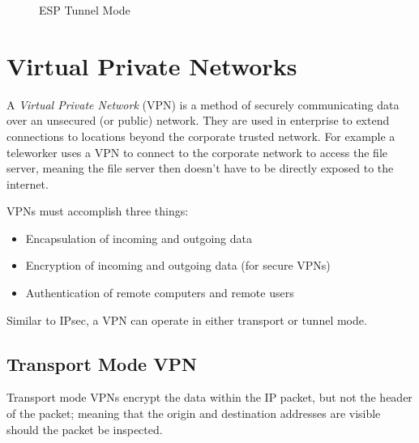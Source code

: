 \begin{figure}[H]
    \centering
    \caption{ESP Tunnel Mode}
\end{figure}

\section{Virtual Private Networks}
A \textit{Virtual Private Network} (VPN) is a method of securely communicating data over an unsecured (or public) network. They are used in enterprise to extend connections to locations beyond the corporate trusted network. For example a teleworker uses a VPN to connect to the corporate network to access the file server, meaning the file server then doesn't have to be directly exposed to the internet. 

VPNs must accomplish three things:
\begin{itemize}
    \item Encapsulation of incoming and outgoing data
    \item Encryption of incoming and outgoing data (for secure VPNs)
    \item Authentication of remote computers and remote users
\end{itemize}

Similar to IPsec, a VPN can operate in either transport or tunnel mode.

\subsection{Transport Mode VPN}
Transport mode VPNs encrypt the data within the IP packet, but not the header of the packet; meaning that the origin and destination addresses are visible should the packet be inspected. 

